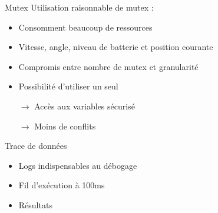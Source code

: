 \documentclass{beamer}
\begin{document}
\begin{frame}{Mutex}
    Utilisation raisonnable de mutex :
    \begin{itemize}
        \item Consomment beaucoup de ressources
        \item Vitesse, angle, niveau de batterie et position courante
        \item Compromis entre nombre de mutex et granularité
        \item Possibilité d’utiliser un seul
    \end{itemize}
    
    \bigskip
    
    \begin{itemize}
        \item[$\rightarrow$] Accès aux variables sécurisé
        \item[$\rightarrow$] Moins de conflits
    \end{itemize}
\end{frame}

\begin{frame}{Trace de données}
    \begin{itemize}
        \item Logs indispensables au débogage
        \item Fil d’exécution à 100ms
        \item Résultats
    \end{itemize}
\end{frame}
\end{document}
